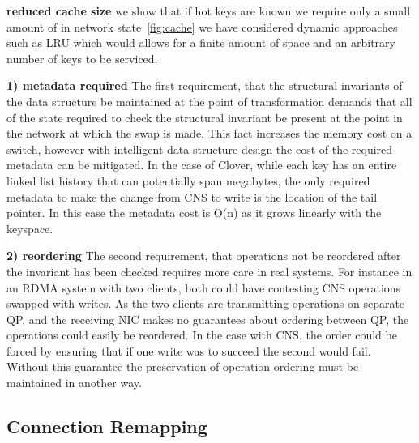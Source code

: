 \textbf{reduced cache size} we show that if hot keys are known we require only a
small amount of in network state~\ref{fig:cache} we have considered dynamic
approaches such as LRU which would allows for a finite amount of space and an
arbitrary number of keys to be serviced.

 

\textbf{1) metadata required} The first requirement, that the structural invariants
of the data structure be maintained at the point of transformation demands that
all of the state required to check the structural invariant be present at the
point in the network at which the swap is made. This fact increases the memory
cost on a switch, however with intelligent data structure design the cost of the
required metadata can be mitigated. In the case of Clover, while each key has
an entire linked list history that can potentially span megabytes, the only
required metadata to make the change from CNS to write is the location of the
tail pointer. In this case the metadata cost is O(n) as it grows linearly with
the keyspace.

\textbf{2) reordering} The second requirement, that operations not be reordered
after the invariant has been checked requires more care in real systems. For
instance in an RDMA system with two clients, both could have contesting CNS
operations swapped with writes. As the two clients are transmitting operations on
separate QP, and the receiving NIC makes no guarantees about ordering between QP,
the operations could easily be reordered. In the case with CNS, the order could
be forced by ensuring that if one write was to succeed the second would fail.
Without this guarantee the preservation of operation ordering must be maintained
in another way.

\subsection{Connection Remapping}


